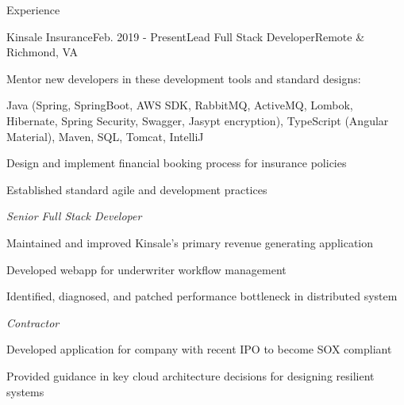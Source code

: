 \documentclass{resume} %
\begin{document}

\begin{rSection}{Experience}

\begin{rSubsection}{Kinsale Insurance}{Feb. 2019 - Present}{\vspace{-0.5em}Lead Full Stack Developer}{Remote \& Richmond, VA}
	\setlength{\itemindent}{.0in}\item{
		Mentor new developers in these development tools and standard designs:
	}
	\setlength{\itemindent}{.0in}\item{
		Java (Spring, SpringBoot, AWS SDK, RabbitMQ, ActiveMQ, Lombok, Hibernate, Spring Security, Swagger, Jasypt encryption), TypeScript (Angular Material), Maven, SQL, Tomcat, IntelliJ
	}
	\setlength{\itemindent}{.0in}\item{
		Design and implement financial booking process for insurance policies
	}
	\setlength{\itemindent}{.0in}\item{
		Established standard agile and development practices 
	}
	

    \emph{Senior Full Stack Developer}
    \setlength{\itemindent}{.0in}\item{
    	Maintained and improved Kinsale's primary revenue generating application
    }
	\setlength{\itemindent}{.0in}\item{ 
		Developed webapp for underwriter workflow management
	}
	\setlength{\itemindent}{.0in}\item{
		Identified, diagnosed, and patched performance bottleneck in distributed system
	}
	
	
	\emph{Contractor}
	\setlength{\itemindent}{.0in}\item{ 
		Developed application for company with recent IPO to become SOX compliant
	}
	\setlength{\itemindent}{.0in}\item{ 
		Provided guidance in key cloud architecture decisions for designing resilient systems
	}
	
	
\end{rSubsection}



\end{rSection}
\end{document}
